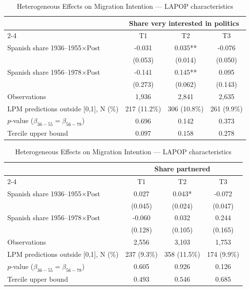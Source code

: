 \begin{table}[!h]
\centering
\renewcommand{\arraystretch}{1.15}
\setlength{\tabcolsep}{6pt}
\captionsetup{justification=centering}
\caption{Heterogeneous Effects on Migration Intention --- LAPOP characteristics}
\begin{tabular*}{\textwidth}{l@{\extracolsep{\fill}}ccc}
\hline
& \multicolumn{3}{c}{Share very interested in politics} \\
\cmidrule(l){2-4}
& T1 & T2 & T3 \\
\hline
Spanish share 1936--1955\(\times\)Post & -0.031 & 0.035** & -0.076 \\
 & (0.053) & (0.014) & (0.050) \\
Spanish share 1956--1978\(\times\)Post & -0.141 & 0.145** & 0.095 \\
 & (0.273) & (0.062) & (0.143) \\
\addlinespace
Observations & 1,936 & 2,841 & 2,635 \\
LPM predictions outside [0,1], N (\%) & 217 (11.2\%) & 306 (10.8\%) & 261 (9.9\%) \\
\(p\)-value (\(\beta_{36{-}55} = \beta_{56{-}78}\)) & 0.696 & 0.142 & 0.373 \\
Tercile upper bound & \(0.097\) & \(0.158\) & \(0.278\) \\
\hline
\end{tabular*}
\begin{tabular*}{\textwidth}{l@{\extracolsep{\fill}}ccc}
& \multicolumn{3}{c}{Share partnered} \\
\cmidrule(l){2-4}
& T1 & T2 & T3 \\
\hline
Spanish share 1936--1955\(\times\)Post & 0.027 & 0.043* & -0.072 \\
 & (0.045) & (0.024) & (0.047) \\
Spanish share 1956--1978\(\times\)Post & -0.060 & 0.032 & 0.244 \\
 & (0.128) & (0.105) & (0.165) \\
\addlinespace
Observations & 2,556 & 3,103 & 1,753 \\
LPM predictions outside [0,1], N (\%) & 237 (9.3\%) & 358 (11.5\%) & 174 (9.9\%) \\
\(p\)-value (\(\beta_{36{-}55} = \beta_{56{-}78}\)) & 0.605 & 0.926 & 0.126 \\
Tercile upper bound & \(0.493\) & \(0.546\) & \(0.685\) \\
\hline
\end{tabular*}
\addvspace{0.3em}
\captionsetup{font=footnotesize, justification=justified, singlelinecheck=false}

\end{table}
